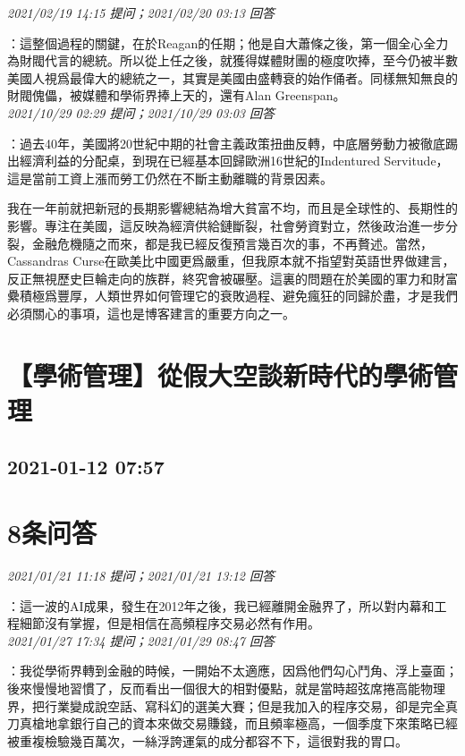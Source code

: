 \documentclass[twocolumn]{ctexart}
\begin{document}
\textit{\hfill\noindent\small 2021/02/19 14:15 提问；2021/02/20 03:13 回答}

：這整個過程的關鍵，在於Reagan的任期；他是自大蕭條之後，第一個全心全力為財閥代言的總統。所以從上任之後，就獲得媒體財團的極度吹捧，至今仍被半數美國人視爲最偉大的總統之一，其實是美國由盛轉衰的始作俑者。同樣無知無良的財閥傀儡，被媒體和學術界捧上天的，還有Alan Greenspan。
\\

\textit{\hfill\noindent\small 2021/10/29 02:29 提问；2021/10/29 03:03 回答}

：過去40年，美國將20世紀中期的社會主義政策扭曲反轉，中底層勞動力被徹底踢出經濟利益的分配桌，到現在已經基本回歸歐洲16世紀的Indentured Servitude，這是當前工資上漲而勞工仍然在不斷主動離職的背景因素。

我在一年前就把新冠的長期影響總結為增大貧富不均，而且是全球性的、長期性的影響。專注在美國，這反映為經濟供給鏈斷裂，社會勞資對立，然後政治進一步分裂，金融危機隨之而來，都是我已經反復預言幾百次的事，不再贅述。當然，Cassandras Curse在歐美比中國更爲嚴重，但我原本就不指望對英語世界做建言，反正無視歷史巨輪走向的族群，終究會被碾壓。這裏的問題在於美國的軍力和財富纍積極爲豐厚，人類世界如何管理它的衰敗過程、避免瘋狂的同歸於盡，才是我們必須關心的事項，這也是博客建言的重要方向之一。
\\


\section{【學術管理】從假大空談新時代的學術管理}
\subsection{2021-01-12 07:57}


\section{8条问答}

\textit{\hfill\noindent\small 2021/01/21 11:18 提问；2021/01/21 13:12 回答}

：這一波的AI成果，發生在2012年之後，我已經離開金融界了，所以對内幕和工程細節沒有掌握，但是相信在高頻程序交易必然有作用。
\\

\textit{\hfill\noindent\small 2021/01/27 17:34 提问；2021/01/29 08:47 回答}

：我從學術界轉到金融的時候，一開始不太適應，因爲他們勾心鬥角、浮上臺面；後來慢慢地習慣了，反而看出一個很大的相對優點，就是當時超弦席捲高能物理界，把行業變成說空話、寫科幻的選美大賽；但是我加入的程序交易，卻是完全真刀真槍地拿銀行自己的資本來做交易賺錢，而且頻率極高，一個季度下來策略已經被重複檢驗幾百萬次，一絲浮誇運氣的成分都容不下，這很對我的胃口。
\end{document}
